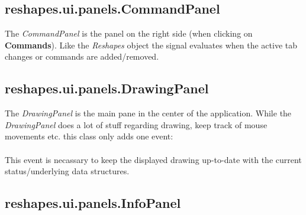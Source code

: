 \subsection{reshapes.ui.panels.CommandPanel}

The \textit{CommandPanel} is the panel on the right side (when clicking on \textbf{Commands}). 
Like the \textit{Reshapes} object the signal evaluates when the active tab changes or commands are added/removed. \\

\subsection{reshapes.ui.panels.DrawingPanel}

The \textit{DrawingPanel} is the main pane in the center of the application.
While the \textit{DrawingPanel} does a lot of stuff regarding drawing, keep track of mouse movements etc. this class only adds one event: \\
 \\
This event is necassary to keep the displayed drawing up-to-date with the current status/underlying data structures.

\subsection{reshapes.ui.panels.InfoPanel}

